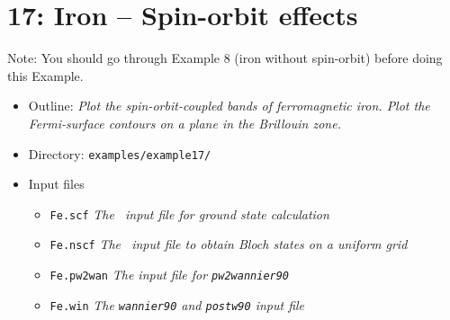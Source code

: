 \documentclass[a4paper,11pt,twoside]{article}
\begin{document}

\cleardoublepage


\section*{17: Iron -- Spin-orbit effects}

Note: You should go through Example 8 (iron without spin-orbit) before
doing this Example.
\begin{itemize}
\item{Outline: \it{Plot the spin-orbit-coupled bands of ferromagnetic
      iron.  Plot the Fermi-surface contours on a plane in the
      Brillouin zone.}}
\item{Directory: {\tt examples/example17/}}
\item{Input files}
\begin{itemize}
\item{ {\tt Fe.scf} {\it The \pwscf\ input file for ground state
    calculation}}
\item{ {\tt Fe.nscf}  {\it The \pwscf\ input file to obtain Bloch
    states on a uniform grid}} 
\item{ {\tt Fe.pw2wan}  {\it The input file for {\tt pw2wannier90}}}
\item{ {\tt Fe.win}  {\it The {\tt wannier90} and {\tt postw90} input file}}
\end{itemize}
\end{itemize}
\end{document}
